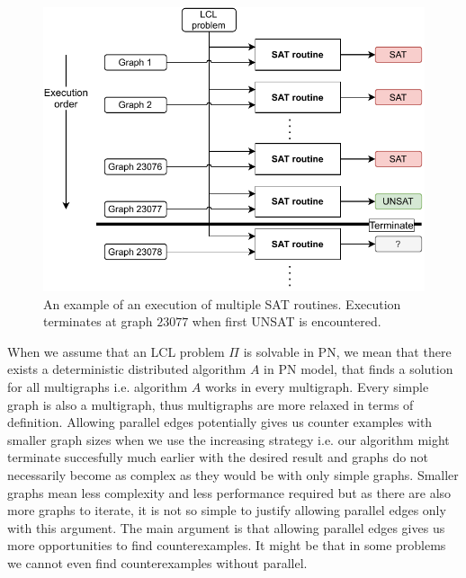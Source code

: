 \begin{figure}[H]
\centering
\includegraphics[]{diagrams/implementation_idea_diagram3.pdf}
\caption{An example of an execution of multiple SAT routines. Execution terminates at graph $23077$ when first UNSAT is encountered.}
\label{fig:implementation:idea:2}
\end{figure}


When we assume that an LCL problem $\Pi$ is solvable in PN, we mean that there exists a deterministic distributed algorithm $A$ in PN model, that finds a solution for all multigraphs i.e. algorithm $A$ works in every multigraph.
Every simple graph is also a multigraph, thus multigraphs are more relaxed in terms of definition.
Allowing parallel edges potentially gives us counter examples with smaller graph sizes when we use the increasing strategy i.e. our algorithm might terminate succesfully much earlier with the desired result and graphs do not necessarily become as complex as they would be with only simple graphs.
Smaller graphs mean less complexity and less performance required but as there are also more graphs to iterate, it is not so simple to justify allowing parallel edges only with this argument.
The main argument is that allowing parallel edges gives us more opportunities to find counterexamples.
It might be that in some problems we cannot even find counterexamples without parallel.

